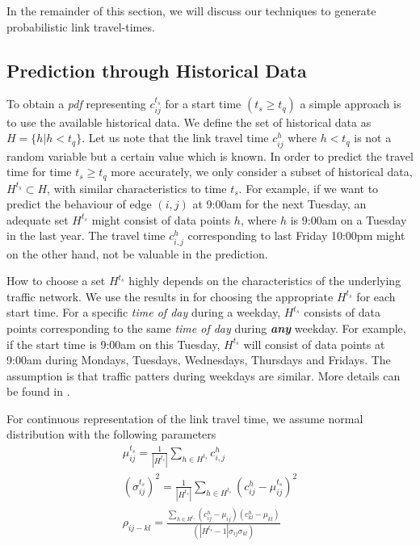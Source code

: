 In the remainder of this section, we will discuss our techniques to generate probabilistic link travel-times.

\subsection{Prediction through Historical Data}
\label{subsec:historical}
To obtain a \textit{pdf} representing $c_{ij}^{t_s}$ for a start time $(t_s \geq t_q)$ a simple approach is to use the available historical data. We define the set of historical data as $H = \{h | h < t_q\}$. Let us note that the link travel time $c_{ij}^h$ where $ h < t_q$ is not a random variable but a certain value which is known. In order to predict the travel time for time $t_s \geq t_q$ more accurately, we only consider a subset of historical data, $H^{t_s} \subset H$, with similar characteristics to time $t_s$. For example, if we want to predict the behaviour of edge $(i,j)$ at 9:00am for the next Tuesday, an adequate set $H^{t_s}$ might consist of data points $h$, where $h$ is 9:00am on a Tuesday in the last year. The travel time $c_{i,j}^h$ corresponding to last Friday 10:00pm might on the other hand, not be valuable in the prediction.

How to choose a set $H^{t_s}$ highly depends on the characteristics of the underlying traffic network. We use the results in \cite{Pan12} for choosing the appropriate $H^{t_s}$ for each start time. For a specific \textit{time of day} during a weekday, $H^{t_s}$ consists of data points corresponding to the same \textit{time of day} during \textbf{\textit{any}} weekday. For example, if the start time is 9:00am on this Tuesday, $H^{t_s}$ will consist of data points at 9:00am during Mondays, Tuesdays, Wednesdays, Thursdays and Fridays. The assumption is that traffic patters during weekdays are similar. More details can be found in \cite{Pan12}.

For continuous representation of the link travel time, we assume normal distribution with the following parameters
\begin{gather}
	\mu_{ij}^{t_s} = \frac{1}{|H^{t_s}|}\sum_{h\in H^{t_s}} c_{i,j}^h\\ 
	(\sigma_{ij}^{t_s})^2 = \frac{1}{|H^{t_s}|}\sum_{h\in H^{t_s}} (c_{ij}^h-\mu_{ij}^{t_s})^2\\
	\rho_{ij-kl} = \frac{\sum_{h\in H^{t_s}} (c_{ij}^h - \mu_{ij}) (c_{kl}^h -
	\mu_{kl})}{(|H^{t_s}-1| \sigma_{ij} \sigma_{kl})}
\end{gather}

